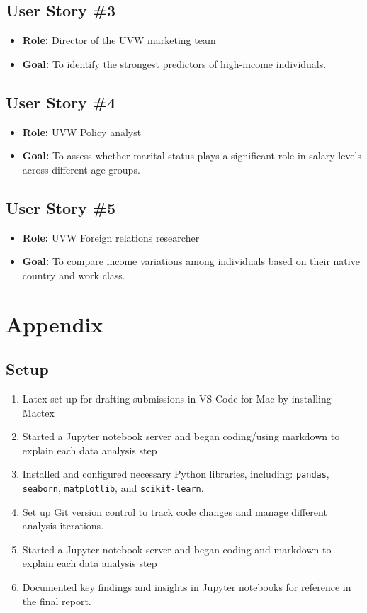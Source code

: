\documentclass[journal,onecolumn]{IEEEtran}
\begin{document}
\subsection{User Story \#3}
\begin{itemize}
    \item \textbf{Role:} Director of the UVW marketing team
    \item \textbf{Goal:} To identify the strongest predictors of high-income individuals.
\end{itemize}

\subsection{User Story \#4}
\begin{itemize}
    \item \textbf{Role:} UVW Policy analyst
    \item \textbf{Goal:} To assess whether marital status plays a significant role in salary levels across different age groups.
\end{itemize}

\subsection{User Story \#5}
\begin{itemize}
    \item \textbf{Role:} UVW Foreign relations researcher
    \item \textbf{Goal:} To compare income variations among individuals based on their native country and work class.
\end{itemize}


\section{Appendix}
\subsection{Setup}
\begin{enumerate}
    \item Latex set up for drafting submissions in VS Code for Mac by installing Mactex
    \item Started a Jupyter notebook server and began coding/using markdown to explain each data analysis step
    \item Installed and configured necessary Python libraries, including: 
    \texttt{pandas}, \texttt{seaborn}, \texttt{matplotlib}, and 
    \texttt{scikit-learn}.
    \item Set up Git version control to track code changes and manage different analysis iterations.
    \item Started a Jupyter notebook server and began coding and markdown to explain each data analysis step
    \item Documented key findings and insights in Jupyter notebooks for reference in the final report.
\end{enumerate}
\end{document}
